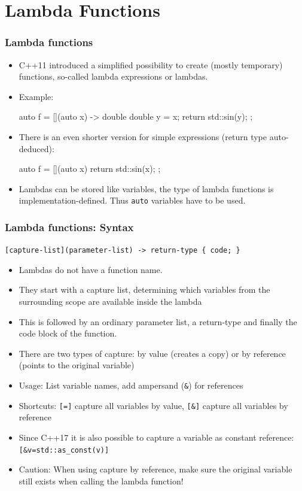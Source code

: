 \documentclass[aspectratio=169,ignorenonframetext,11pt]{beamer}
\def\inline{\lstinline[basicstyle=\small\ttfamily]}
\begin{document}
\section{Lambda Functions}

\begin{frame}[fragile]
  \frametitle<presentation>{Lambda functions}
  \begin{itemize}
  \item C++11 introduced a simplified possibility to create (mostly temporary) functions, so-called lambda expressions or lambdas.
  \item Example:
\begin{cppcode}
auto f = [](auto x) -> double {
  double y = x;
  return std::sin(y);
};
\end{cppcode}
\item There is an even shorter version for simple expressions (return type auto-deduced):
\begin{cppcode}
auto f = [](auto x) { return std::sin(x); };
\end{cppcode}
\item Lambdas can be stored like variables, the type of lambda functions is implementation-defined. Thus \inline!auto! variables have to be used.
  \end{itemize}
\end{frame}

\begin{frame}[fragile]
  \frametitle{Lambda functions: Syntax}
\inline![capture-list](parameter-list) -> return-type { code; }!
\vspace*{1em}
  \begin{itemize}
  \item Lambdas do not have a function name. 
  \item They start with a capture list, determining which variables from the surrounding scope are available inside the lambda
  \item This is followed by an ordinary parameter list, a return-type and finally the code block of the function.
  \item There are two types of capture: by value (creates a copy) or by reference (points to the original variable)
  \item Usage: List variable names, add ampersand (\inline!&!) for references
  \item Shortcuts: \inline![=]! capture all variables by value, \inline![&]! capture all variables by reference
  \item Since C++17 it is also possible to capture a variable as constant reference: \inline![&v=std::as_const(v)]!
  \item \alert{Caution:} When using capture by reference, make sure the original variable still exists when calling the lambda function!
  \end{itemize}
\end{frame}
\end{document}
